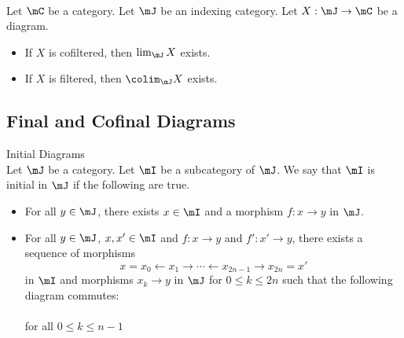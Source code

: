 \documentclass[a4paper]{article}
\begin{document}
\begin{lmm}{}{}\\
Let $\mC$ be a category. Let $\mJ$ be an indexing category. Let $X:\mJ\to\mC$ be a diagram. 
\begin{itemize}
\item If $X$ is cofiltered, then $\lim_\mJ X$ exists. 
\item If $X$ is filtered, then $\colim_\mJ X$ exists. 
\end{itemize}
\end{lmm}

\subsection{Final and Cofinal Diagrams}
\begin{defn}{Initial Diagrams}{}\\
Let $\mJ$ be a category. Let $\mI$ be a subcategory of $\mJ$. We say that $\mI$ is initial in $\mJ$ if the following are true. 
\begin{itemize}
\item For all $y\in\mJ$, there exists $x\in\mI$ and a morphism $f:x\to y$ in $\mJ$. 
\item For all $y\in\mJ$, $x,x'\in\mI$ and $f:x\to y$ and $f':x'\to y$, there exists a sequence of morphisms $$x=x_0\leftarrow x_1\rightarrow\cdots\leftarrow x_{2n-1}\rightarrow x_{2n}=x'$$ in $\mI$ and morphisms $x_k\to y$ in $\mJ$ for $0\leq k\leq 2n$ such that the following diagram commutes: \\
 \\
for all $0\leq k\leq n-1$
\end{itemize}
\end{defn}
\end{document}
